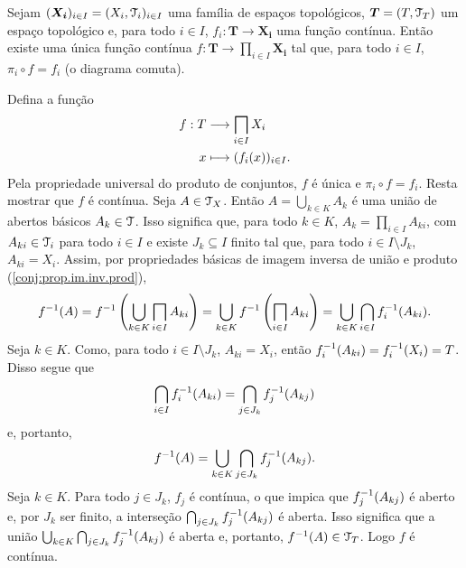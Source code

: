 \begin{prop}
Sejam $(\bm{X_i})_{i \in I} = (X_i,\mathcal{T}_i)_{i \in I}$ uma família de espaços topológicos, $\bm T = (T,\mathcal{T}_T)$ um espaço topológico e, para todo $i \in I$, $f_i: \bm T \to \bm{X_i}$ uma função contínua. Então existe uma única função contínua $f: \bm T \to \prod_{i \in I} \bm{X_i}$ tal que, para todo $i \in I$, $\pi_i \circ f = f_i$ (o diagrama comuta).
\begin{figure}
\centering
{}
\end{figure}
\end{prop}
\begin{defi}
Defina a função
	\begin{align*}
	\func{f}{T}{ \prod_{i \in I} X_i}{ x}{ (f_i(x))_{i \in I}}.
	\end{align*}
Pela propriedade universal do produto de conjuntos, $f$ é única e $\pi_i \circ f = f_i$. Resta mostrar que $f$ é contínua. Seja $A \in \mathcal{T}_X$. Então $A=\bigcup_{k \in K} A_k$ é uma união de abertos básicos $A_k \in \mathcal{T}$. Isso significa que, para todo $k \in K$, $A_k = \prod_{i \in I} A_{ki}$, com $A_{ki} \in \mathcal{T}_i$ para todo $i \in I$ e existe $J_k \subseteq I$ finito tal que, para todo $i \in I \setminus J_k$, $A_{ki} = X_i$. Assim, por propriedades básicas de imagem inversa de união e produto (\ref{conj:prop.im.inv.prod}),
		\begin{equation*}
		f\inv(A) = f\inv\left(\bigcup_{k \in K}\prod_{i \in I} A_{ki}\right) = \bigcup_{k \in K} f\inv \left( \prod_{i \in I} A_{ki} \right) = \bigcup_{k \in K}\bigcap_{i \in I}f_i\inv(A_{ki}).
		\end{equation*}
Seja $k \in K$. Como, para todo $i \in I \setminus J_k$, $A_{ki} = X_i$, então $f_i^{-1}(A_{ki}) = f_i^{-1}(X_i) = T$. Disso segue que
	\begin{equation*}
	\bigcap_{i \in I}f_i^{-1}(A_{ki}) = \bigcap_{j \in J_k}f_j^{-1}(A_{kj})
	\end{equation*}
e, portanto,
	\begin{equation*}
	f^{-1}(A) = \bigcup_{k \in K}\bigcap_{j \in J_k}f_j^{-1}(A_{kj}).
	\end{equation*}
Seja $k \in K$. Para todo $j \in J_k$, $f_j$ é contínua, o que impica que $f_j^{-1}(A_{kj})$ é aberto e, por $J_k$ ser finito, a interseção $\bigcap_{j \in J_k}f_j^{-1}(A_{kj})$ é aberta. Isso significa que a união $\bigcup_{k \in K}\bigcap_{j \in J_k}f_j^{-1}(A_{kj})$ é aberta e, portanto, $f^{-1}(A) \in \mathcal{T}_T$. Logo $f$ é contínua.
\end{defi}


